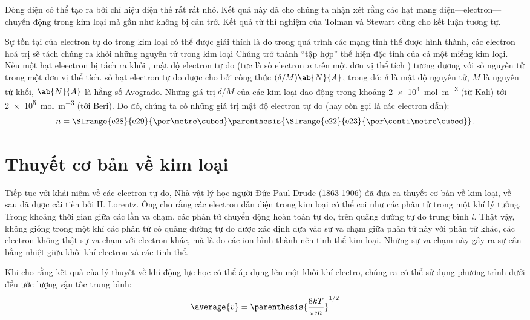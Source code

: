 Dòng điện cỏ thể tạo ra bởi chỉ hiệu điện thế rất rất nhỏ.
Kết quả này đã cho chúng ta nhận xét rằng các hạt mang điện---electron---chuyển động trong kim loại mà gần như không bị cản trở.
Kết quả từ thí nghiệm của Tolman và Stewart cũng cho kết luận tương tự.

Sự tồn tại của electron tự do trong kim loại có thể được giải thích là do trong quá trình các mạng tinh thể được hình thành, các electron hoá trị sẽ tách chúng ra khỏi những nguyên tử trong kim loại
Chúng trở thành ``tập hợp'' thể hiện đặc tính của cả một miếng kim loại.
Nếu một hạt eleectron bị tách ra khỏi , mật độ electron tự do (tưc là số electron $n$ trên một đơn vị thể tích ) tương đương với số nguyên tử trong một đơn vị thể tích.
số hạt electron tự do được cho bởi công thức $(\delta/M)\ab{N}{A}$, trong đó: $\delta$ là mật độ nguyên tử, $M$ là nguyên tử khối, $\ab{N}{A}$ là hằng số Avogrado.
Những giá trị $\delta/M$ của các kim loại dao động trong khoảng \SI{2e4}{\mole\per\metre\cubed} (từ Kali) tới \SI{2e5}{\mole\per\metre\cubed} (tới Beri).
Do đó, chúng ta có những giá trị mật độ electron tự do (hay còn gọi là các electron dẫn):
\begin{equation}\label{eq:11_2}
    n = \text{\SIrange{e28}{e29}{\per\metre\cubed}} \parenthesis{\text{\SIrange{e22}{e23}{\per\centi\metre\cubed}}}.
\end{equation}

\section{Thuyết cơ bản về kim loại}\label{sec:11_2}

Tiếp tục với khái niệm về các electron tự do, Nhà vật lý học người Đức Paul Drude  (1863-1906) đã đưa ra thuyết cơ bản về kim loại, về sau đã được cải tiến bởi H.  Lorentz.
Ông cho rằng các electron dẫn điện trong kim loại có thể coi như các phân tử trong một khí lý tưởng.
Trong khoảng thời gian giữa các lần va chạm, các phân tử chuyển động hoàn toàn tự do, trên  quãng đường tự do trung bình $l$.
Thật vậy, không giống trong một khí các phân tử có quãng đường tự do được xác định dựa vào sự va chạm giữa phân tử này với phân tử khác, các electron không thật sự va chạm với electron khác, mà là do các ion hình thành nên tinh thể kim loại.
Những sự va chạm này gây ra sự cân bằng nhiệt giữa khối khí electron và các tinh thể.

Khi cho rằng kết quả của lý thuyết về khí động lực học có thể áp dụng lên một khối khí electro, chúng ra có thể sử dụng phương trình dưới đểu ước lượng vận tốc trung bình:
\begin{equation}\label{eq:11_3}
    \average{v} = \parenthesis{\frac{8kT}{\pi m}}^{1/2}
\end{equation}

